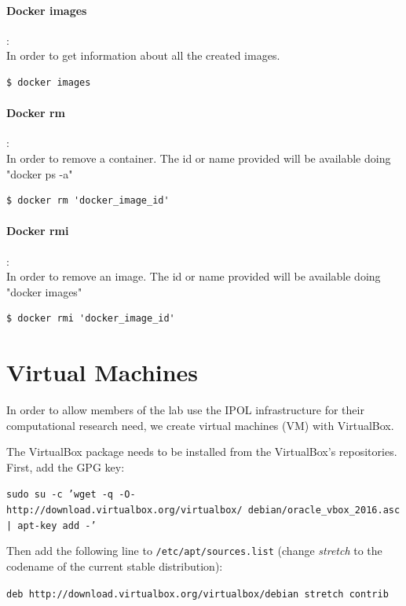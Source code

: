 \documentclass[a4paper,12pt]{article}
\begin{document}
\paragraph{Docker images}:\\
In order to get information about all the created images.
\begin{lstlisting}[firstnumber=1,breaklines]
  $ docker images
\end{lstlisting}

\paragraph{Docker rm}:\\
In order to remove a container. The id or name provided will be available doing "docker ps -a"
\begin{lstlisting}[firstnumber=1,breaklines]
  $ docker rm 'docker_image_id'
\end{lstlisting}

\paragraph{Docker rmi}:\\
In order to remove an image. The id or name provided will be available doing "docker images"
\begin{lstlisting}[firstnumber=1,breaklines]
  $ docker rmi 'docker_image_id'
\end{lstlisting}



\section{Virtual Machines}
\label{sec:virtual_machines}
In order to allow members of the lab use the IPOL infrastructure for their computational research need, we create virtual machines (VM) with VirtualBox.

The VirtualBox package needs to be installed from the VirtualBox's repositories. First, add the GPG key:

{\tt sudo su -c 'wget -q -O- http://download.virtualbox.org/virtualbox/\
debian/oracle\_vbox\_2016.asc | apt-key add -'}

Then add the following line to {\tt /etc/apt/sources.list} (change \emph{stretch} to the codename of the current stable distribution):

{\tt deb http://download.virtualbox.org/virtualbox/debian stretch contrib}
\end{document}
